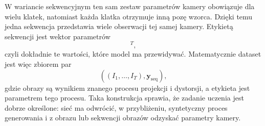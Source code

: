 \documentclass[12pt,a4paper]{report}
\begin{document}
W wariancie sekwencyjnym ten sam zestaw parametrów kamery obowiązuje dla wielu klatek,
natomiast każda klatka otrzymuje inną pozę wzorca. Dzięki temu jedna sekwencja przedstawia
wiele obserwacji tej samej kamery. Etykietą sekwencji jest wektor parametrów
\begin{equation}
    [f_x,f_y,c_x,c_y,k_1,k_2,p_1,p_2,k_3]^T,
\end{equation}
czyli dokładnie te wartości, które model ma przewidywać. Matematycznie dataset jest więc
zbiorem par
\begin{equation}
    \left((I_1,\dots,I_T),\mathbf{y}_{\text{seq}}\right),
\end{equation}
gdzie obrazy są wynikiem znanego procesu projekcji i dystorsji, a etykieta jest parametrem
tego procesu. Taka konstrukcja sprawia, że zadanie uczenia jest dobrze określone: sieć ma
odwrócić, w przybliżeniu, syntetyczny proces generowania i z obrazu lub sekwencji obrazów
odzyskać parametry kamery.
\end{document}
